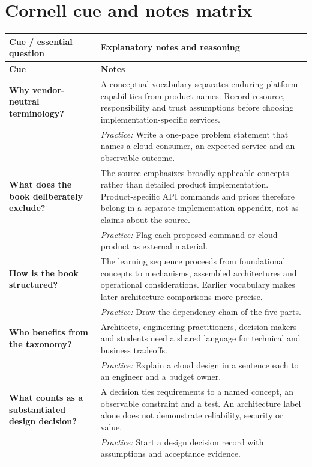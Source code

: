\documentclass[10pt,letterpaper]{article}
\begin{document}
\section{Cornell cue and notes matrix}
\small\setlength{\LTleft}{0pt}\setlength{\LTright}{0pt plus 1fill}
\begin{longtable}{>{\RaggedRight\arraybackslash}p{}>{\RaggedRight\arraybackslash}p{}}
\toprule\textbf{Cue / essential question}&\textbf{Explanatory notes and reasoning}\\\midrule\endfirsthead\toprule\textbf{Cue}&\textbf{Notes}\\\midrule\endhead
\textbf{Why vendor-neutral terminology?} & A conceptual vocabulary separates enduring platform capabilities from product names. Record resource, responsibility and trust assumptions before choosing implementation-specific services.\\[3pt]& \textcolor{petrol}{\emph{Practice:} Write a one-page problem statement that names a cloud consumer, an expected service and an observable outcome.}\\[8pt]\midrule
\textbf{What does the book deliberately exclude?} & The source emphasizes broadly applicable concepts rather than detailed product implementation. Product-specific API commands and prices therefore belong in a separate implementation appendix, not as claims about the source.\\[3pt]& \textcolor{petrol}{\emph{Practice:} Flag each proposed command or cloud product as external material.}\\[8pt]\midrule
\textbf{How is the book structured?} & The learning sequence proceeds from foundational concepts to mechanisms, assembled architectures and operational considerations. Earlier vocabulary makes later architecture comparisons more precise.\\[3pt]& \textcolor{petrol}{\emph{Practice:} Draw the dependency chain of the five parts.}\\[8pt]\midrule
\textbf{Who benefits from the taxonomy?} & Architects, engineering practitioners, decision-makers and students need a shared language for technical and business tradeoffs.\\[3pt]& \textcolor{petrol}{\emph{Practice:} Explain a cloud design in a sentence each to an engineer and a budget owner.}\\[8pt]\midrule
\textbf{What counts as a substantiated design decision?} & A decision ties requirements to a named concept, an observable constraint and a test. An architecture label alone does not demonstrate reliability, security or value.\\[3pt]& \textcolor{petrol}{\emph{Practice:} Start a design decision record with assumptions and acceptance evidence.}\\[8pt]\midrule
\end{longtable}\normalsize
\end{document}

